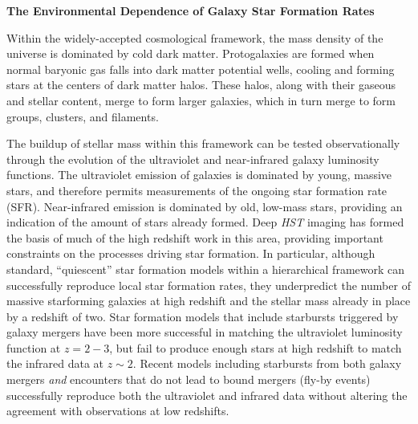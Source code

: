 \documentclass[12pt]{plan}
\begin{document}
\begin{center}
\LARGE
{\bf The Environmental Dependence of Galaxy Star Formation Rates}
\normalsize
\end{center}

Within the widely-accepted cosmological framework, the mass density of
the universe is dominated by cold dark matter.  Protogalaxies are
formed when normal baryonic gas falls into dark matter potential
wells, cooling and forming stars at the centers of dark matter halos.
These halos, along with their gaseous and stellar content, merge to
form larger galaxies, which in turn merge to form groups, clusters,
and filaments.

The buildup of stellar mass within this framework can be tested
observationally through the evolution of the
ultraviolet %
and
near-infrared
galaxy luminosity functions.  The ultraviolet emission of galaxies is
dominated by young, massive stars, and therefore permits measurements
of the ongoing star formation rate (SFR).  Near-infrared emission is
dominated by old, low-mass stars, providing an indication of the
amount of stars already formed.  Deep \emph{HST} imaging has formed
the basis of much of the high redshift work in this
area\cite{Cohen99,Cohen02,Madau96,Madau98,Steidel99}, providing
important constraints on the processes driving star formation.  In
particular, although standard, ``quiescent'' star formation models
within a hierarchical framework can successfully reproduce local star
formation rates, they underpredict the number of massive starforming
galaxies at high redshift and the stellar mass already in place by a
redshift of two\cite{Fontana99,Fontana03,Pozzetti03,Cimatti02}. Star
formation models that include starbursts triggered by galaxy
mergers
have been more successful in matching
the ultraviolet luminosity function at $z=2-3$, but
fail to produce enough stars at high redshift to match the infrared
data at $z \sim 2$.\cite{Somerville01,Cimatti02} Recent models including starbursts
from both galaxy mergers \emph{and} encounters that do not lead to
bound mergers (fly-by events) successfully reproduce both the
ultraviolet and infrared data without altering the agreement with
observations at low redshifts.\cite{Menci03}
\end{document}
